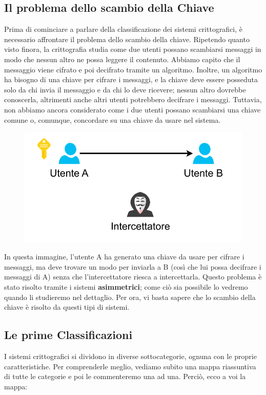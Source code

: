 \documentclass{rapport}
\begin{document}
\subsection{Il problema dello scambio della Chiave}

Prima di cominciare a parlare della classificazione dei sistemi crittografici, è necessario affrontare il problema dello scambio della chiave. Ripetendo quanto visto finora, la crittografia studia come due utenti possano scambiarsi messaggi in modo che nessun altro ne possa leggere il contenuto. Abbiamo capito che il messaggio viene cifrato e poi decifrato tramite un algoritmo. Inoltre, un algoritmo ha bisogno di una chiave per cifrare i messaggi, e la chiave deve essere posseduta solo da chi invia il messaggio e da chi lo deve ricevere; nessun altro dovrebbe conoscerla, altrimenti anche altri utenti potrebbero decifrare i messaggi. Tuttavia, non abbiamo ancora considerato come i due utenti possano scambiarsi una chiave comune o, comunque, concordare su una chiave da usare nel sistema.


\begin{figure}[h]
    \centering
    \includegraphics[width=0.6\linewidth]{logos/0_5_cripto.pdf}
\end{figure}

In questa immagine, l’utente A ha generato una chiave da usare per cifrare i messaggi, ma deve trovare un modo per inviarla a B (così che lui possa decifrare i messaggi di A) senza che l’intercettatore riesca a intercettarla. Questo problema è stato risolto tramite i sistemi \textbf{asimmetrici}; come ciò sia possibile lo vedremo quando li studieremo nel dettaglio. Per ora, vi basta sapere che lo scambio della chiave è risolto da questi tipi di sistemi.


\newpage

\subsection{Le prime Classificazioni}

I sistemi crittografici si dividono in diverse sottocategorie, ognuna con le proprie caratteristiche. Per comprenderle meglio, vediamo subito una mappa riassuntiva di tutte le categorie e poi le commenteremo una ad una. Perciò, ecco a voi la mappa:
\end{document}
